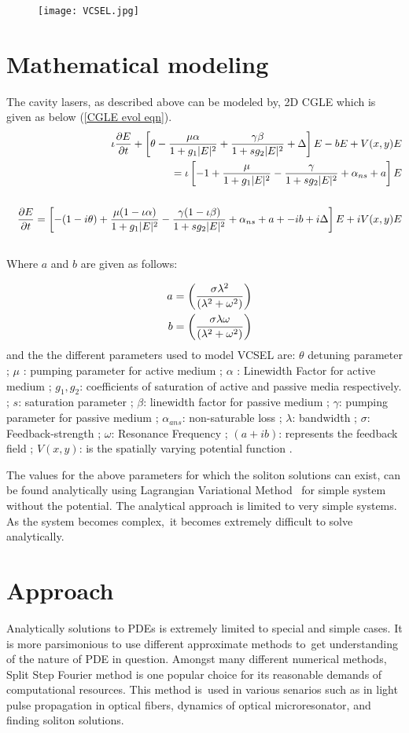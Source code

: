 \begin{figure}[h]
    \texttt{[image: VCSEL.jpg]}
\end{figure}

\section{Mathematical modeling}
The cavity lasers, as described above can be modeled by, 2D CGLE which is given as below (\ref{CGLE evol eqn}).
\begin{eqnarray}
    &&\iota\frac{\partial E}{\partial t} + \left[\theta - \frac{\mu \alpha}{1+g_1|E|^2} + \frac{\gamma\beta}{1+sg_2|E|^2} + \Delta \right]E - bE	+V(x,y)E \cr
    &&= \iota\left[-1 + \frac{\mu}{1+g_1|E|^2} - \frac{\gamma}{1+sg_2|E|^2}+\alpha_{ns}+a\right]E \\
    && \cr
    && \frac{\partial E}{\partial t} = \left[-(1- i \theta) + \frac{\mu(1-\iota \alpha)}{1+g_1|E|^2} - \frac{\gamma(1-\iota\beta)}{1+sg_2|E|^2} +\alpha_{ns} + a + - i b +i\Delta\right] E + iV(x,y) E \cr
    && \label{CGLE evol eqn}
\end{eqnarray}
Where $a$ and $b$ are given as follows:

\begin{eqnarray}
&& a = \left(\frac{\sigma\lambda^2}{(\lambda^2+\omega^2)}\right) \cr
&& b = \left(\frac{\sigma\lambda\omega}{(\lambda^2+\omega^2)}\right)  \nonumber 
\end{eqnarray}
and the the different parameters used to model VCSEL are:
$\theta$ detuning parameter ;
$\mu$ : pumping parameter for active medium ;
$\alpha$ : Linewidth Factor for active medium ;
$g_1 , g_2$: coefficients of saturation of active and passive media respectively. ;
$s$: saturation parameter ;
$\beta$: linewidth factor for passive medium ;
$\gamma$: pumping parameter for passive medium ;
$\alpha_{ans}$: non-saturable loss ;
$\lambda$: bandwidth ;
$\sigma$: Feedback-strength ;
$\omega$: Resonance Frequency ;
$(a+ib)$: represents the feedback field ;
$V(x,y)$: is the spatially varying potential function .

The values for the above parameters for which the soliton solutions can exist, can be found analytically using Lagrangian Variational Method \cite{kaurGenerationDynamicsOne2017a,kaurCavitySolitonMolecules2018}\
for simple system without the potential. The analytical approach is limited to very simple systems. As the system becomes complex,\
it becomes extremely difficult to solve analytically. 


\section{Approach}
    Analytically solutions to PDEs is extremely limited to special and simple cases. It is more parsimonious to use different approximate methods to\
get understanding of the nature of PDE in question. Amongst many different numerical methods, Split Step Fourier method is one popular choice for its reasonable demands of computational resources. This method is\
used in various senarios such as in light pulse propagation in optical fibers, dynamics of optical microresonator, and finding soliton solutions.

